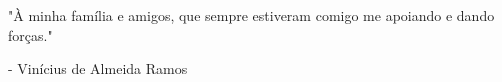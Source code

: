 \begin{center}
 	"À minha família e amigos, que sempre estiveram comigo me apoiando e dando forças."
  		
  	- Vinícius de Almeida Ramos
\end{center}